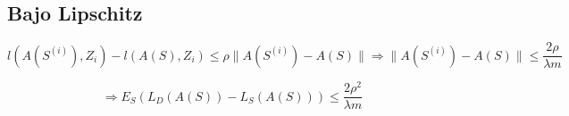 \subsection{Bajo Lipschitz}
\begin{equation*}
l(A(S^{(i)}),Z_i) - l(A(S), Z_i) \leq \rho \|A(S^{(i)}) - A(S) \|
\Rightarrow \|A(S^{(i)}) - A(S) \| \leq \frac{2\rho}{\lambda m}
\end{equation*}

\begin{equation*}
\Rightarrow E_S(L_D(A(S)) - L_S(A(S))) \leq \frac{2\rho^2}{\lambda m}
\end{equation*}
